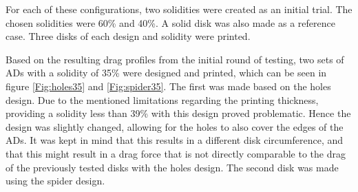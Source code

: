 For each of these configurations, two solidities were created as an initial trial. The chosen solidities were 60\% and 40\%. A solid disk was also made as a reference case. Three disks of each design and solidity were printed. 

Based on the resulting drag profiles from the initial round of testing, two sets of \gls{AD}s with a solidity of 35\% were designed and printed, which can be seen in figure \ref{Fig:holes35} and \ref{Fig:spider35}. The first was made based on the \gls{holes} design. Due to the mentioned limitations regarding the printing thickness, providing a solidity less than 39\% with this design proved problematic. Hence the design was slightly changed, allowing for the holes to also cover the edges of the \gls{AD}s. It was kept in mind that this results in a different disk circumference, and that this might result in a drag force that is not directly comparable to the drag of the previously tested disks with the \gls{holes} design. The second disk was made using the \gls{spider} design. 

